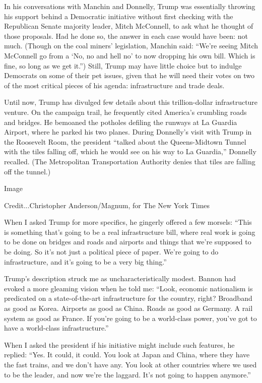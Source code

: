 In his conversations with Manchin and Donnelly, Trump was essentially
throwing his support behind a Democratic initiative without first
checking with the Republican Senate majority leader, Mitch McConnell, to
ask what he thought of those proposals. Had he done so, the answer in
each case would have been: not much. (Though on the coal miners'
legislation, Manchin said: ``We're seeing Mitch McConnell go from a `No,
no and hell no' to now dropping his own bill. Which is fine, so long as
we get it.'') Still, Trump may have little choice but to indulge
Democrats on some of their pet issues, given that he will need their
votes on two of the most critical pieces of his agenda: infrastructure
and trade deals.

Until now, Trump has divulged few details about this trillion-dollar
infrastructure venture. On the campaign trail, he frequently cited
America's crumbling roads and bridges. He bemoaned the potholes defiling
the runways at La Guardia Airport, where he parked his two planes.
During Donnelly's visit with Trump in the Roosevelt Room, the president
``talked about the Queens-Midtown Tunnel with the tiles falling off,
which he would see on his way to La Guardia,'' Donnelly recalled. (The
Metropolitan Transportation Authority denies that tiles are falling off
the tunnel.)

Image

Credit...Christopher Anderson/Magnum, for The New York Times

When I asked Trump for more specifics, he gingerly offered a few
morsels: ``This is something that's going to be a real infrastructure
bill, where real work is going to be done on bridges and roads and
airports and things that we're supposed to be doing. So it's not just a
political piece of paper. We're going to do infrastructure, and it's
going to be a very big thing.''

Trump's description struck me as uncharacteristically modest. Bannon had
evoked a more gleaming vision when he told me: ``Look, economic
nationalism is predicated on a state-of-the-art infrastructure for the
country, right? Broadband as good as Korea. Airports as good as China.
Roads as good as Germany. A rail system as good as France. If you're
going to be a world-class power, you've got to have a world-class
infrastructure.''

When I asked the president if his initiative might include such
features, he replied: ``Yes. It could, it could. You look at Japan and
China, where they have the fast trains, and we don't have any. You look
at other countries where we used to be the leader, and now we're the
laggard. It's not going to happen anymore.''

